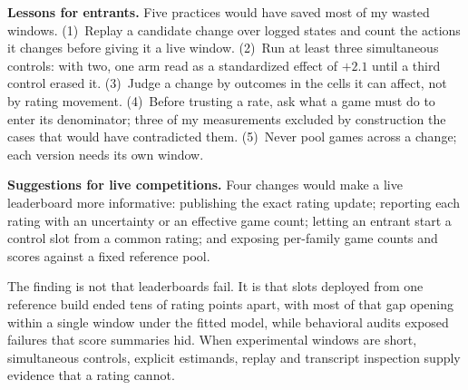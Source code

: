 \documentclass{article}
\begin{document}
\textbf{Lessons for entrants.} Five practices would have saved most of my wasted
windows. (1)~Replay a candidate change over logged states and count the actions
it changes before giving it a live window. (2)~Run at least three simultaneous
controls: with two, one arm read as a standardized effect of $+2.1$ until a third
control erased it. (3)~Judge a change by outcomes in the cells it can affect, not
by rating movement. (4)~Before trusting a rate, ask what a game must do to enter
its denominator; three of my measurements excluded by construction the cases
that would have contradicted them. (5)~Never pool games across a change; each
version needs its own window.

\textbf{Suggestions for live competitions.} Four changes would make a live
leaderboard more informative: publishing the exact rating update; reporting each
rating with an uncertainty or an effective game count; letting an entrant start
a control slot from a common rating; and exposing per-family game counts and
scores against a fixed reference pool.

The finding is not that leaderboards fail. It is that slots deployed from one
reference build ended tens of rating points apart, with most of that gap opening
within a single window under the fitted model,
while behavioral audits exposed failures that score summaries hid. When
experimental windows are short, simultaneous controls, explicit estimands,
replay and transcript inspection supply evidence that a rating cannot.
\label{endmain}
\end{document}
